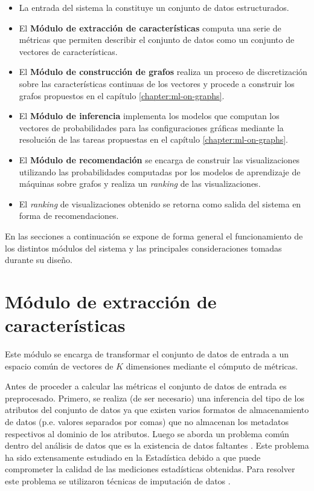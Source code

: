 \begin{itemize}
    \item La entrada del sistema la constituye un conjunto de datos estructurados.
    \item El \textbf{M\'odulo de extracci\'on de caracter\'isticas} computa una serie
    de m\'etricas que permiten describir el conjunto de datos como un conjunto de vectores de caracter\'isticas.
    \item El \textbf{M\'odulo de construcci\'on de grafos} realiza un proceso de discretizaci\'on
    sobre las caracter\'isticas continuas de los vectores y procede a construir los grafos propuestos
    en el cap\'itulo \ref{chapter:ml-on-graphs}.
    \item El \textbf{M\'odulo de inferencia} implementa los modelos
    que computan los vectores de probabilidades para las configuraciones gr\'aficas mediante la resoluci\'on
    de las tareas propuestas en el cap\'itulo \ref{chapter:ml-on-graphs}.
    \item El \textbf{M\'odulo de recomendaci\'on} se encarga de construir las visualizaciones
    utilizando las probabilidades computadas por los modelos de
    aprendizaje de m\'aquinas sobre grafos y realiza un \textit{ranking}
    de las visualizaciones.
    \item El \textit{ranking} de visualizaciones obtenido se retorna como salida del sistema en forma de
    recomendaciones.
\end{itemize}

En las secciones a continuaci\'on se expone de forma general el funcionamiento de los distintos m\'odulos
del sistema y las principales consideraciones tomadas durante su dise\~no.

\section{M\'odulo de extracci\'on de caracter\'isticas}

Este m\'odulo se encarga de transformar el conjunto de datos de entrada a un
espacio com\'un de vectores de $K$ dimensiones mediante el c\'omputo de m\'etricas. 

Antes de proceder a calcular las m\'etricas el conjunto de datos de entrada es preprocesado.
Primero, se realiza (de ser necesario) una inferencia del tipo de los atributos del conjunto de datos ya que existen
varios formatos de almacenamiento de datos (p.e. valores separados por comas) que no almacenan los metadatos
respectivos al dominio de los atributos. Luego se aborda un problema com\'un dentro del an\'alisis de datos que
es la existencia de datos faltantes \cite{schafer2002missing}. Este problema ha sido extensamente estudiado en la Estad\'istica 
debido a que puede comprometer la calidad de las mediciones estad\'isticas obtenidas. Para
resolver este problema se utilizaron t\'ecnicas de imputaci\'on de datos \cite{jadhav2019comparison}.

